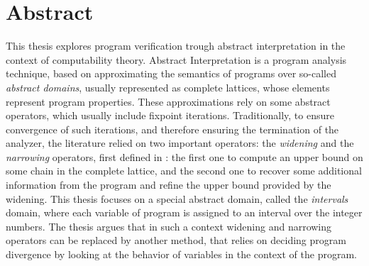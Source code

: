 {}
\begingroup

\chapter*{Abstract}
This thesis explores program verification trough abstract
interpretation in the context of computability theory. Abstract
Interpretation is a program analysis technique, based on approximating
the semantics of programs over so-called \emph{abstract domains},
usually represented as complete lattices, whose elements represent
program properties. These approximations rely on some abstract
operators, which usually include fixpoint iterations. Traditionally,
to ensure convergence of such iterations, and therefore ensuring the
termination of the analyzer, the literature relied on two important
operators: the \emph{widening} and the \emph{narrowing} operators,
first defined in \cite{patrickradhia:one}: the first one to compute an
upper bound on some chain in the complete lattice, and the second one
to recover some additional information from the program and refine the
upper bound provided by the widening. This thesis focuses on a special
abstract domain, called the \emph{intervals} domain, where each
variable of program is assigned to an interval over the integer
numbers. The thesis argues that in such a context widening and
narrowing operators can be replaced by another method, that relies on
deciding program divergence by looking at the behavior of variables in
the context of the program.

\endgroup

\vfill
